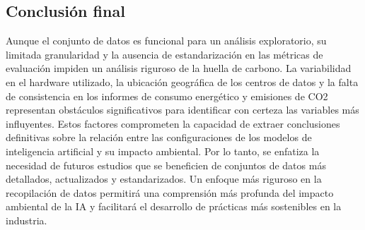\documentclass[journal]{IEEEtran}
\begin{document}
	\subsection{Conclusión final}
	Aunque el conjunto de datos es funcional para un análisis exploratorio, su limitada granularidad y la ausencia de estandarización en las métricas de evaluación impiden un análisis riguroso de la huella de carbono. La variabilidad en el hardware utilizado, la ubicación geográfica de los centros de datos y la falta de consistencia en los informes de consumo energético y emisiones de CO2 representan obstáculos significativos para identificar con certeza las variables más influyentes.
	Estos factores comprometen la capacidad de extraer conclusiones definitivas sobre la relación entre las configuraciones de los modelos de inteligencia artificial y su impacto ambiental. Por lo tanto, se enfatiza la necesidad de futuros estudios que se beneficien de conjuntos de datos más detallados, actualizados y estandarizados. Un enfoque más riguroso en la recopilación de datos permitirá una comprensión más profunda del impacto ambiental de la IA y facilitará el desarrollo de prácticas más sostenibles en la industria.
	
	
	
	
\end{document}
